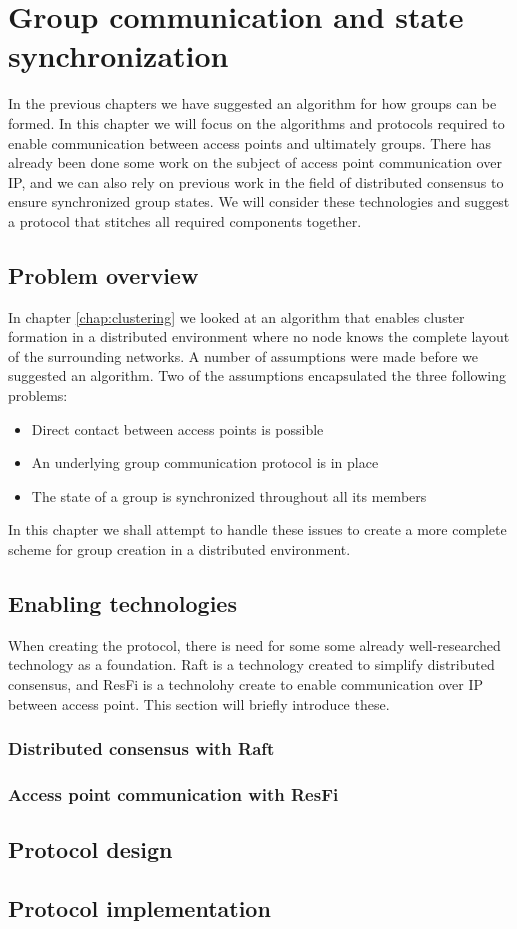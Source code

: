 \chapter{Group communication and state synchronization}
In the previous chapters we have suggested an algorithm for how groups can be formed.
In this chapter we will focus on the algorithms and protocols required to enable communication between access points and ultimately groups.
There has already been done some work on the subject of access point communication over IP, and we can also rely on previous work in the field
of distributed consensus to ensure synchronized group states. We will consider these technologies and suggest a protocol that stitches all required components together. 


\section{Problem overview}
In chapter \ref{chap:clustering} we looked at an algorithm that enables cluster formation in a distributed environment where no node knows the complete layout of the surrounding networks.
A number of assumptions were made before we suggested an algorithm. Two of the assumptions encapsulated the three following problems:
\begin{itemize}
\item Direct contact between access points is possible
\item An underlying group communication protocol is in place
\item The state of a group is synchronized throughout all its members
\end{itemize}
In this chapter we shall attempt to handle these issues to create a more complete scheme for group creation in a distributed environment.

\section{Enabling technologies}
When creating the protocol, there is need for some some already well-researched technology as a foundation. Raft \cite{raftio} is a technology created to simplify distributed consensus, and
ResFi is a technolohy create to enable communication over IP between access point. This section will briefly introduce these. 
\subsection{Distributed consensus with Raft}
\subsection{Access point communication with ResFi}

\section{Protocol design}

\section{Protocol implementation}
